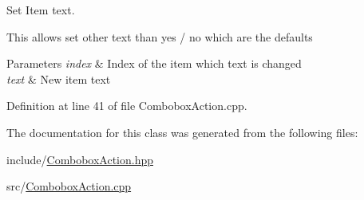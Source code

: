 Set Item text. 

This allows set other text than yes / no which are the defaults 
\begin{DoxyParams}{Parameters}
{\em index} & Index of the item which text is changed \\
\hline
{\em text} & New item text \\
\hline
\end{DoxyParams}


Definition at line 41 of file Combobox\+Action.\+cpp.



The documentation for this class was generated from the following files\+:\begin{DoxyCompactItemize}
\item 
include/\mbox{\hyperlink{ComboboxAction_8hpp}{Combobox\+Action.\+hpp}}\item 
src/\mbox{\hyperlink{ComboboxAction_8cpp}{Combobox\+Action.\+cpp}}\end{DoxyCompactItemize}
